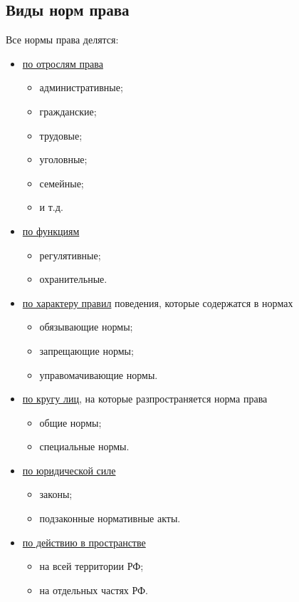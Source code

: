 \documentclass[a5paper,10pt]{article}
\begin{document}
		\subsection{Виды норм права}
			Все нормы права делятся:
			\begin{itemize}[itemsep=0pt]
				\item \underline{по отрослям права}
					\begin{itemize}[itemsep=0pt]
						\item административные;
						\item гражданские;
						\item трудовые;
						\item уголовные;
						\item семейные;
						\item и т.д.
					\end{itemize}

				\item \underline{по функциям}
					\begin{itemize}[itemsep=0pt]
						\item регулятивные;
						\item охранительные.
					\end{itemize}
				
				\item \underline{по характеру правил} поведения, которые содержатся в нормах
					\begin{itemize}[itemsep=0pt]
						\item обязывающие нормы;
						\item запрещающие нормы;
						\item управомачивающие нормы.
					\end{itemize}

				\item \underline{по кругу лиц}, на которые разпространяется норма права
					\begin{itemize}[itemsep=0pt]
						\item общие нормы;
						\item специальные нормы.
					\end{itemize}
				
				\item \underline{по юридической силе}
					\begin{itemize}[itemsep=0pt]
						\item законы;
						\item подзаконные нормативные акты.
					\end{itemize}
				
				\item \underline{по действию в пространстве}
					\begin{itemize}[itemsep=0pt]
						\item на всей территории РФ;
						\item на отдельных частях РФ.
					\end{itemize}
			\end{itemize}
\end{document}
